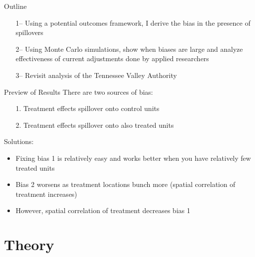 \documentclass[aspectratio=43]{beamer}
\begin{document}



\begin{frame}{Outline}

    \begin{itemize}
        \item[1--] Using a potential outcomes framework, I derive the bias in the presence of spillovers
        
        \item[2--] Using Monte Carlo simulations, show when biases are large and analyze effectiveness of current adjustments done by applied researchers 
        
        \item[3--] Revisit \citet{Kline_Moretti_2014} analysis of the Tennessee Valley Authority
    \end{itemize} 
\end{frame}

\begin{frame}{Preview of Results}
    There are two sources of bias:
        \begin{itemize}
            \item[1.] Treatment effects spillover onto control units
            \item[2.] Treatment effects spillover onto also treated units
        \end{itemize}

    Solutions:
        \begin{itemize}
            \item Fixing bias 1 is relatively easy and works better when you have relatively few treated units
            
            \item Bias 2 worsens as treatment locations bunch more (spatial correlation of treatment increases)
            
            \item However, spatial correlation of treatment decreases bias 1
        \end{itemize}
\end{frame}



\section{Theory}
\end{document}

